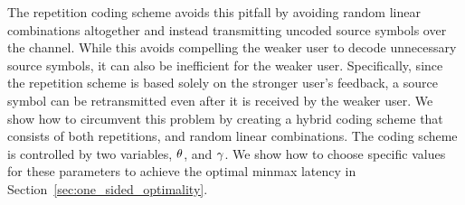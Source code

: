 The repetition coding scheme avoids this pitfall by avoiding random linear combinations altogether and instead transmitting uncoded source symbols over the channel.  While this avoids compelling the weaker user to decode unnecessary source symbols, it can also be inefficient for the weaker user.  Specifically, since the repetition scheme is based solely on the stronger user's feedback, a source symbol can be retransmitted even after it is received by the weaker user.  We show how to circumvent this problem by creating a hybrid coding scheme that consists of both repetitions, and random linear combinations.  The coding scheme is controlled by two variables, $\theta$, and $\gamma$.  We show how to choose specific values for these parameters to achieve the optimal minmax latency in Section~\ref{sec:one_sided_optimality}.






